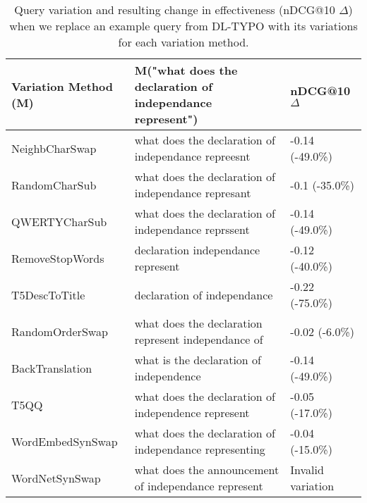 \begin{table}[ht]
\centering
\caption{Query variation and resulting change in effectiveness (nDCG@10 $\Delta$)  when we replace an example query from DL-TYPO with its variations for each variation method.}
\label{tab:m-egs}
\begin{tabularx}{\columnwidth}{l|X|l}
\textbf{Variation Method (M)} & \textbf{M("what does the declaration of independance represent")} & \textbf{nDCG@10 $\Delta$} \\ \hline
NeighbCharSwap  & what does the declaration of independance repreesnt  & -0.14 (-49.0\%) \\
RandomCharSub   & what does the declaration of independance represant  & -0.1 (-35.0\%)  \\
QWERTYCharSub   & what does the declaration of independance reprssent  & -0.14 (-49.0\%) \\ \hline
RemoveStopWords & declaration independance represent                   & -0.12 (-40.0\%) \\
T5DescToTitle   & declaration of independance                          & -0.22 (-75.0\%) \\ \hline
RandomOrderSwap & what does the declaration represent independance of  & -0.02 (-6.0\%)  \\ \hline
BackTranslation & what is the declaration of independence              & -0.14 (-49.0\%) \\
T5QQ            & what does the declaration of independence represent  & -0.05 (-17.0\%) \\
WordEmbedSynSwap    & what does the declaration of independance representing            & -0.04 (-15.0\%)           \\
WordNetSynSwap  & what does the announcement of independance represent & Invalid variation \\ \hline
\end{tabularx}%
\end{table}
